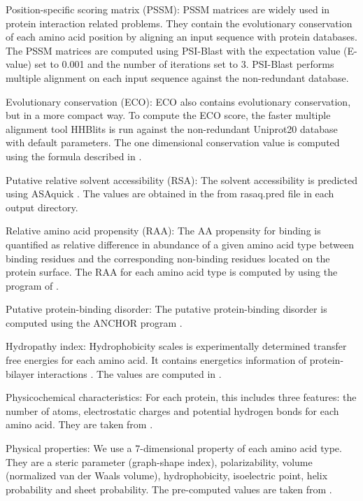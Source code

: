 \documentclass{bioinfo}
\begin{document}
\begin{methods}
Position-specific scoring matrix (PSSM): PSSM matrices are widely used in protein interaction related problems. They contain the evolutionary conservation of each amino acid position by aligning an input sequence with protein databases. The PSSM matrices are computed using PSI-Blast \citep{altschul1997gapped} with the expectation value (E-value) set to 0.001 and the number of iterations set to 3. PSI-Blast performs multiple alignment on each input sequence against the non-redundant database. 

Evolutionary conservation (ECO): ECO also contains evolutionary conservation, but in a more compact way. To compute the ECO score, the faster multiple alignment tool HHBlits \citep{remmert2012hhblits} is run against the non-redundant Uniprot20 database with default parameters. The one dimensional conservation value is computed using the formula described in \citep{zhang2019comprehensive}.

Putative relative solvent accessibility (RSA): The solvent accessibility is predicted using ASAquick \citep{faraggi2014accurate}. The values are obtained in the from rasaq.pred file in each output directory.

Relative amino acid propensity (RAA): The AA propensity for binding is quantified as relative difference in abundance of a given amino acid type between binding residues and the corresponding non-binding residues located on the protein surface. The RAA for each amino acid type is computed by \cite{zhang2019comprehensive} using the program of  \cite{vacic2007composition}.

Putative protein-binding disorder: The putative protein-binding disorder is computed using the ANCHOR program \citep{dosztanyi2009anchor}.

Hydropathy index: Hydrophobicity scales is experimentally determined transfer free energies for each amino acid. It contains energetics information of protein-bilayer interactions \citep{wimley1996experimentally}. The values are computed in \citep{kyte1982simple}.

Physicochemical characteristics: For each protein, this includes three features: the number of atoms, electrostatic charges and potential hydrogen bonds for each amino acid. They are taken from \citep{zhang2019sequence}.

Physical properties: We use a 7-dimensional property of each amino acid type. They are a steric parameter (graph-shape index), polarizability, volume (normalized van der Waals volume), hydrophobicity, isoelectric point, helix probability and sheet probability. The pre-computed values are taken from \citep{zhang2019sequence}.


\end{methods}
\end{document}
